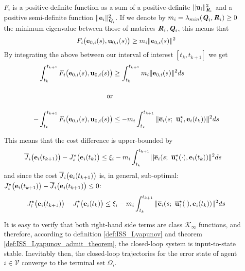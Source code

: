 \begin{gg_box}
  $F_i$ is a positive-definite function as a sum of a positive-definite
  $\|\bm{\mathbf{u}}_i\|^2_{\bm{\mathit{R}}_i}$ and a positive semi-definite function
  $\|\bm{\mathbf{e}}_i\|^2_{\bm{\mathit{Q}}_i}$. If we denote by
  $m_i = \lambda_{min}(\bm{\mathit{Q}}_i, \bm{\mathit{R}}_i) \geq 0$ the minimum eigenvalue
  between those of matrices $\bm{\mathit{R}}_i, \bm{\mathit{Q}}_i$, this means that
  \begin{align}
    F_i \big(\bm{\mathbf{e}}_{0,i}(s), \bm{\mathbf{u}}_{0,i} (s)\big) \geq m_i \|\bm{\mathbf{e}}_{0,i}(s)\|^2
  \end{align}
  By integrating the above between our interval of interest $[t_k, t_{k+1}]$ we get
  \begin{align}
    \int_{t_k}^{t_{k+1}} F_i \big(\vect{e}_{0,i}(s), \vect{u}_{0,i} (s)\big) &\geq \int_{t_k}^{t_{k+1}} m_i \|\vect{e}_{0,i}(s)\|^2 ds \\[2.5ex]
    \text{or}\\[2.5ex]
    -\int_{t_k}^{t_{k+1}} F_i \big(\vect{e}_{0,i}(s), \vect{u}_{0,i} (s)\big)
    &\leq -m_i \int_{t_k}^{t_{k+1}} \| \overline{\vect{e}}_i(s;\ \overline{\vect{u}}_i^{\star}, \vect{e}_i(t_k)) \|^2 ds
  \end{align}
\end{gg_box}
This means that the cost difference is upper-bounded by
\begin{align}
  \overline{J}_i\big(\bm{\mathbf{e}}_i(t_{k+1})\big) - J_i^{\star}\big(\bm{\mathbf{e}}_i(t_k)\big)
    &\leq \xi_i-m_i \int_{t_k}^{t_{k+1}} \| \overline{\bm{\mathbf{e}}}_i(s;\ \overline{\bm{\mathbf{u}}}_i^{\star}(\cdot), \bm{\mathbf{e}}_i(t_k)) \|^2 ds
\end{align}
and since the cost $\overline{J}_i\big(\bm{\mathbf{e}}_i(t_{k+1})\big)$ is, in general,
sub-optimal: $J_i^{\star}\big(\bm{\mathbf{e}}_i(t_{k+1})\big) - \overline{J}_i\big(\bm{\mathbf{e}}_i(t_{k+1})\big) \leq 0$:
\begin{align}
 J_i^{\star}\big(\vect{e}_i(t_{k+1})\big) - J_i^{\star}\big(\vect{e}_i(t_k)\big)
   \leq \xi_i-m_i \int_{t_k}^{t_{k+1}} \| \overline{\vect{e}}_i(s;\ \overline{\vect{u}}_i^{\star}(\cdot), \vect{e}_i(t_k)) \|^2 ds
 \label{eq:J_opt_between_consecutive_k_2}
\end{align}

It is easy to verify that both right-hand side terms are class
$\mathcal{K}_{\infty}$ functions, and therefore, according to definition
\eqref{def:ISS_Lyapunov} and theorem \eqref{def:ISS_Lyapunov_admit_theorem},
the closed-loop system is input-to-state stable. Inevitably then, the
closed-loop trajectories for the error state of agent $i \in \mathcal{V}$
converge to the terminal set $\Omega_i$.

